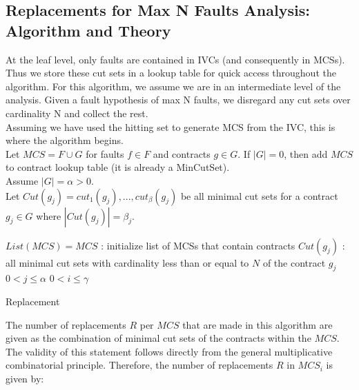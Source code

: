 \subsection{Replacements for Max N Faults Analysis: Algorithm and Theory}

At the leaf level, only faults are contained in IVCs (and consequently in MCSs). Thus we store these cut sets in a lookup table for quick access throughout the algorithm. For this algorithm, we assume we are in an intermediate level of the analysis. Given a fault hypothesis of max N faults, we disregard any cut sets over cardinality N and collect the rest.\\

Assuming we have used the hitting set to generate MCS from the IVC, this is where the algorithm begins. \\

Let $MCS = F \cup G$ for faults $f \in F$ and contracts $g \in G$. If $|G| = 0$, then add $MCS$ to contract lookup table (it is already a MinCutSet). \\

Assume $|G| = \alpha > 0$.\\

Let $Cut(g_j) = {cut_1(g_j), ..., cut_{\beta}(g_j)}$ be all minimal cut sets for a contract $g_j \in G$ where $|Cut(g_j)|=\beta_j$.\\

\begin{algorithm}[H]
	$List(MCS) = {MCS}$ : initialize list of MCSs that contain contracts \;
	$Cut(g_j)$ : all minimal cut sets with cardinality less than or equal to $N$ of the contract $g_j$ \;
	$0 < j \leq \alpha$ \;
	$0 < i \leq \gamma$ \;
	\caption{Replacement}
	\label{alg:repl_alg}
\end{algorithm}

The number of replacements $R$ per $MCS$ that are made in this algorithm are given as the combination of minimal cut sets of the contracts within the $MCS$. The validity of this statement follows directly from the general multiplicative combinatorial principle. Therefore, the number of replacements $R$ in $MCS_i$ is given by:\\

